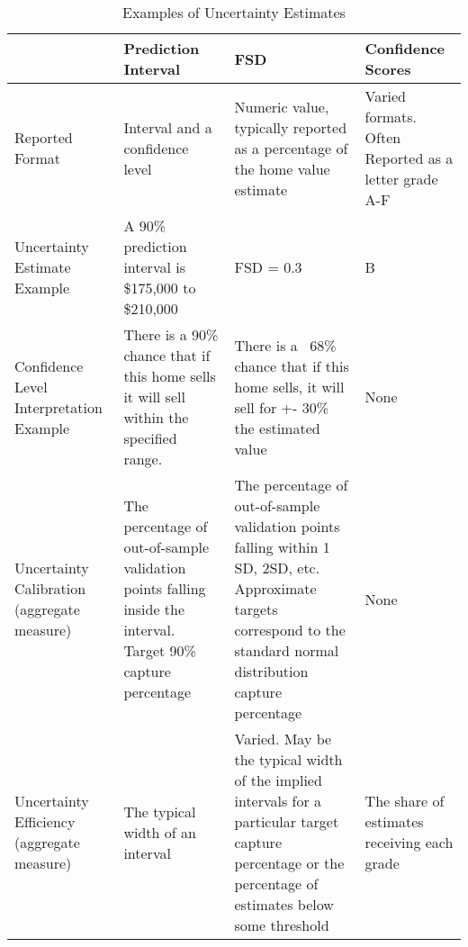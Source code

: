 \documentclass[colTwo]{anon}
\theoremstyle{definition}
\begin{document}
\begin{table*}[h!]
\centering
\begin{tabular}{|p{2.8cm} | p{3.6cm} | p{3.6cm} | p{3.6cm} |}
 \hline
  & \textbf{Prediction Interval} & \textbf{FSD} & \textbf{Confidence Scores} \\ [0.5ex]
 \hline\hline
 Reported Format & Interval and a confidence level & Numeric value, typically reported as a percentage of the home value estimate & Varied formats. Often Reported as a letter grade A-F \\ \hline
 Uncertainty Estimate Example & A 90\% prediction interval is \$175,000 to \$210,000 & FSD = 0.3 & B \\
 \hline
Confidence Level Interpretation Example & There is a 90\% chance that if this home sells it will sell within the specified range. & There is a ~68\% chance that if this home sells, it will sell for +- 30\% the estimated value & None \\
\hline
Uncertainty Calibration
(aggregate measure) & The percentage of out-of-sample validation points falling inside the interval. Target 90\% capture percentage & The percentage of out-of-sample validation points falling within 1 SD, 2SD, etc. Approximate targets correspond to the standard normal distribution capture percentage & None \\
\hline
 Uncertainty Efficiency
(aggregate measure)
 & The typical width of an interval & Varied. May be the typical width of the implied intervals for a particular target capture percentage or the percentage of estimates below some threshold & The share of estimates receiving each grade \\ [1ex]
 \hline
\end{tabular}
\caption{Examples of Uncertainty Estimates}
\label{table:1}
\end{table*}
\end{document}
